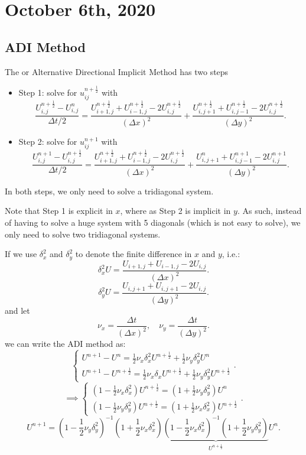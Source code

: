 \documentclass[../main/main.tex]{subfiles}
\begin{document}
\section{October  6th, 2020}
\subsection{ADI Method}
The  or Alternative Directional Implicit Method has two steps
\begin{itemize}
    \item 
Step 1: solve for $u_{ij}^{n+\frac{1}{2}}$ with 
\[
    \frac{U_{i,j}^{n+ \frac{1}{2}}- U_{i,j}^n}{\Delta t / 2} = \frac{U_{i+1,j}^{n+\frac{1}{2}}+U_{i-1,j}^{n+\frac{1}{2}}-2U_{i,j}^{n+\frac{1}{2}}}{(\Delta x)^2} +  \frac{U_{i,j+1}^{n+\frac{1}{2}}+U_{i,j-1}^{n+\frac{1}{2}}-2U_{i,j}^{n+\frac{1}{2}}}{(\Delta y)^2} 
.\] 
    \item 
Step 2: solve for $u_{ij}^{n+1}$ with
\[
    \frac{U_{i,j}^{n+ 1}- U_{i,j}^{n+\frac{1}{2}}}{\Delta t / 2} = \frac{U_{i+1,j}^{n+\frac{1}{2}}+U_{i-1,j}^{n+\frac{1}{2}}-2U_{i,j}^{n+\frac{1}{2}}}{(\Delta x)^2} +  \frac{U_{i,j+1}^{n}+U_{i,j-1}^{n+1}-2U_{i,j}^{n+1}}{(\Delta y)^2} 
.\] 
\end{itemize}
In both steps, we only need to solve a tridiagonal system. 
\begin{remark}
    Note that Step 1 is explicit in $x$, where as Step 2 is implicit in  $y$. As such, instead of having to solve a huge system with 5 diagonals (which is not easy to solve), we only need to solve two tridiagonal systems. 
\end{remark}
If we use $\delta_x^2$ and $\delta_y^2$ to denote the finite difference in $x$ and  $y$, i.e.:  \[
    \delta_x ^2 U = \frac{U_{i+1,j}+U_{i-1,j}-2U_{i,j}}{(\Delta x)^2}
.\]\[ 
    \delta_y ^2 U = \frac{U_{i,j+1}+U_{i,j+1}-2U_{i,j}}{(\Delta y)^2}
.\] and let \[
\nu_x = \frac{\Delta t}{(\Delta x)^2},\quad \nu_y = \frac{\Delta t}{(\Delta y)^2}
.\]  we can write the ADI method as: \[
\begin{cases} 
U^{n+1} - U^{n} = \frac{1}{2} \nu_x \delta_x^2U^{n+\frac{1}2} + \frac{1}{2} \nu_y \delta_y^2 U^n\\
U^{n+1} - U^{n+\frac{1}{2}} = \frac{1}{2} \nu_x \delta_x U^{n+\frac{1}{2}} + \frac{1}{2}\nu_y \delta_y^2 U^{n+\frac{1}{2}}
\end{cases}
.\] \[
\implies 
\begin{cases}
    (1-\frac{1}2 \nu_x \delta_x^2)U^{n+\frac{1}{2}} = (1+\frac{1}{2}\nu_y \delta_y^2)U^n\\
    (1-\frac{1}2 \nu_y \delta_y^2)U^{n+\frac{1}{2}} = (1+\frac{1}{2}\nu_x \delta_x^2)U^{n+\frac{1}{2}}
\end{cases}
.\] \[
U^{n+1} = (1-\frac{1}{2}\nu_y \delta_y^2)^{-1}(1+\frac{1}{2}\nu_x\delta_x^2) \underbrace{(1-\frac{1}{2}\nu_x\delta_x^2)^{-1}(1+\frac{1}{2}\nu_y \delta_y^2)}_{U^{n+\frac{1}{2}}}U^n
.\] 
\end{document}
